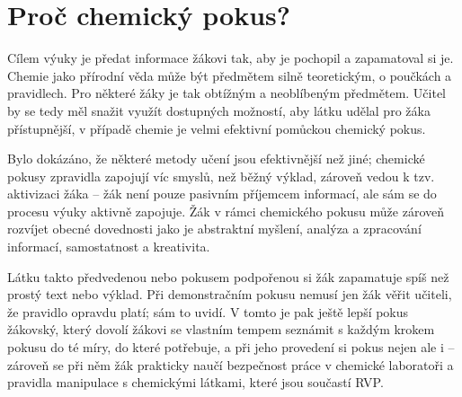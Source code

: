 \section{Proč chemický pokus?}
Cílem výuky je předat informace žákovi tak, aby je pochopil a zapamatoval si je. Chemie jako přírodní věda může být předmětem silně teoretickým, o poučkách a pravidlech. Pro některé žáky je tak obtížným a neoblíbeným předmětem.\cite{oblibenost} Učitel by se tedy měl snažit využít dostupných možností, aby látku udělal pro žáka přístupnější, v případě chemie je velmi efektivní pomůckou chemický pokus.

Bylo dokázáno, že některé metody učení jsou efektivnější než jiné;\cite{badani} chemické pokusy zpravidla zapojují víc smyslů, než běžný výklad, zároveň vedou k tzv. aktivizaci žáka -- žák není pouze pasivním příjemcem informací, ale sám se do procesu výuky aktivně zapojuje.\cite{aktivizace} Žák v rámci chemického pokusu může zároveň rozvíjet obecné dovednosti jako je abstraktní myšlení, analýza a zpracování informací, samostatnost a kreativita.\cite{ostrava}\cite{aktivizace}

Látku takto předvedenou nebo pokusem podpořenou si žák zapamatuje spíš než prostý text nebo výklad.\cite{badani} Při demonstračním pokusu nemusí jen žák věřit učiteli, že pravidlo opravdu platí; sám to uvidí. V tomto je pak ještě lepší pokus žákovský, který dovolí žákovi se vlastním tempem seznámit s každým krokem pokusu do té míry, do které potřebuje, a při jeho provedení si pokus nejen  ale i  -- zároveň se při něm žák prakticky naučí bezpečnost práce v chemické laboratoři a pravidla manipulace s chemickými látkami, které jsou součastí RVP.


